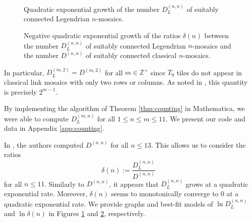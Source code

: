 \documentclass{article}
\newcommand{\Z}{\mathbb{Z}}
\begin{document}
\begin{figure}
    \centering
    \caption{Quadratic exponential growth of the number $D_L^{(n,n)}$ of suitably connected Legendrian $n$-mosaics.}
    \label{app-fig:b1}
\end{figure}

\begin{figure}
    \centering
    \caption{Negative quadratic exponential growth of the ratios $\delta(n)$ between the number $D_L^{(n,n)}$ of suitably connected Legendrian $n$-mosaics and the number $D^{(n,n)}$ of suitably connected classical $n$-mosaics.}
    \label{app-fig:b2}
\end{figure}

In particular, $D_L^{(m,2)}=D^{(m,2)}$ for all $m\in\Z^+$ since $T_9$ tiles do not appear in classical link mosaics with only two rows or columns. As noted in \cite{mosaic-count}, this quantity is precisely $2^{m-1}$.

By implementing the algorithm of Theorem \ref{thm:counting} in Mathematica, we were able to compute $D_L^{(m,n)}$ for all $1\leq n\leq m\leq 11$. We present our code and data in Appendix \ref{app:counting}.

In \cite{mosaic-count}, the authors computed $D^{(n,n)}$ for all $n\leq 13$. This allows us to consider the ratios
\[
\delta(n):= \frac{D_L^{(n,n)}}{D^{(n,n)}}
\]
for all $n\leq 11$. Similarly to $D^{(n,n)}$, it appears that $D_L^{(n,n)}$ grows at a quadratic exponential rate. Moreover, $\delta(n)$ seems to monotonically converge to 0 at a quadratic exponential rate. We provide graphs and best-fit models of $\ln D_L^{(n,n)}$ and $\ln \delta(n)$ in Figures \ref{app-fig:b1} and \ref{app-fig:b2}, respectively.
\end{document}
